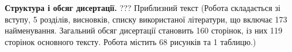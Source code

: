 \textbf{Структура і обсяг дисертації.}
???
Приблизний текст (Робота складається зі вступу, 5 розділів, висновків, списку використаної літератури, що включає 173 найменування. Загальний обсяг дисертації становить 160 сторінок, із них 119 сторінок основного тексту. Робота містить 68 рисунків та 1 таблицю.)
